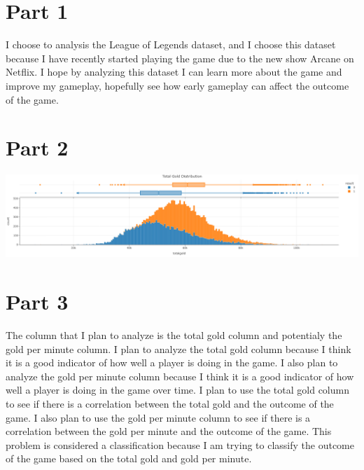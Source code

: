\documentclass[12pt, answers]{exam}
\begin{document}
\section*{Part 1}

I choose to analysis the League of Legends dataset, and I choose this dataset because I have recently started playing the game due to the new show Arcane on Netflix. I hope by analyzing this dataset I can learn more about the game and improve my gameplay, hopefully see how early gameplay can affect the outcome of the game.

\section*{Part 2}
\includegraphics[scale=.275]{totalGoldDistrubution.png}

\section*{Part 3}
The column that I plan to analyze is the total gold column and potentialy the gold per minute column. I plan to analyze the total gold column because I think it is a good indicator of how well a player is doing in the game. I also plan to analyze the gold per minute column because I think it is a good indicator of how well a player is doing in the game over time. I plan to use the total gold column to see if there is a correlation between the total gold and the outcome of the game. I also plan to use the gold per minute column to see if there is a correlation between the gold per minute and the outcome of the game. This problem is considered a classification because I am trying to classify the outcome of the game based on the total gold and gold per minute. 
\end{document}
